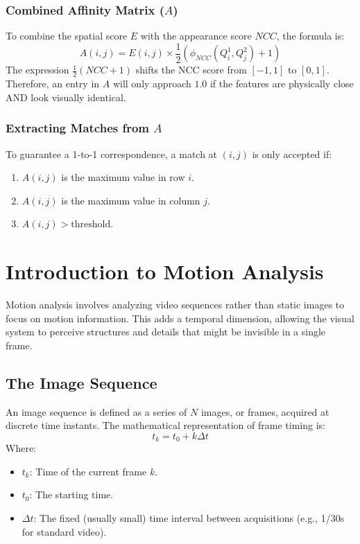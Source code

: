 \documentclass{report}
\begin{document}
\subsection{Combined Affinity Matrix ($A$)}
To combine the spatial score $E$ with the appearance score $NCC$, the formula is:
\begin{equation}
    A(i,j) = E(i,j) \times \frac{1}{2}(\phi_{NCC}(Q_i^1, Q_j^2) + 1)
\end{equation}
The expression $\frac{1}{2}(NCC + 1)$ shifts the NCC score from $[-1, 1]$ to $[0, 1]$. Therefore, an entry in $A$ will only approach $1.0$ if the features are physically close AND look visually identical.

\subsection{Extracting Matches from $A$}
To guarantee a 1-to-1 correspondence, a match at $(i,j)$ is only accepted if:
\begin{enumerate}
    \item $A(i,j)$ is the maximum value in row $i$.
    \item $A(i,j)$ is the maximum value in column $j$.
    \item $A(i,j) > \text{threshold}$.
\end{enumerate}









\chapter{Introduction to Motion Analysis}
Motion analysis involves analyzing video sequences rather than static images to focus on motion information. This adds a temporal dimension, allowing the visual system to perceive structures and details that might be invisible in a single frame.

\section{The Image Sequence}
An image sequence is defined as a series of $N$ images, or frames, acquired at discrete time instants.
The mathematical representation of frame timing is:
\begin{equation}
    t_{k} = t_{0} + k\Delta t
\end{equation}
Where:
\begin{itemize}
    \item $t_{k}$: Time of the current frame $k$.
    \item $t_{0}$: The starting time.
    \item $\Delta t$: The fixed (usually small) time interval between acquisitions (e.g., 1/30s for standard video).
\end{itemize}
\end{document}
